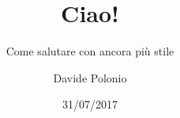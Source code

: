 \documentclass{beamer}
\title{Ciao!}
\subtitle{Come salutare con ancora più stile}
\date{31/07/2017}
\author{Davide Polonio}
\institute{Università degli studi di Padova}
\begin{document}
 \begin{frame}
  \maketitle
 \end{frame}
\end{document}
